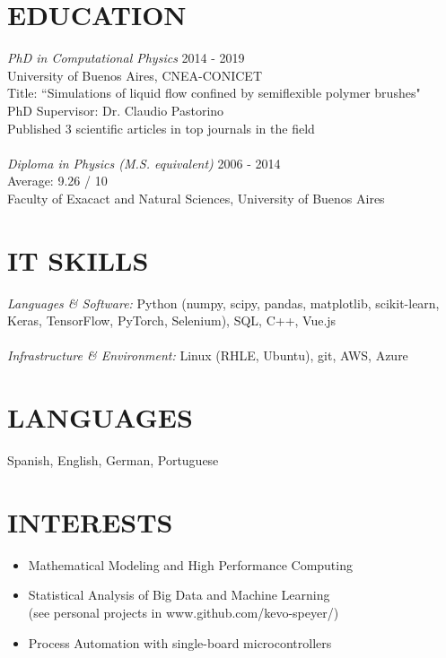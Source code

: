 \documentclass[margin]{res}
\begin{document}
\begin{resume}
\section{EDUCATION} {\sl PhD in Computational Physics}  \hfill 2014 - 2019 \\
                University of Buenos Aires, CNEA-CONICET \\ 
                Title: ``Simulations of liquid flow confined by semiflexible 
		polymer brushes"  \\
                PhD Supervisor: Dr. Claudio Pastorino \\ 
                Published 3 scientific articles in top journals in the field \\ 
		\\
 		{\sl Diploma in Physics (M.S. equivalent) }  \hfill 2006 - 2014 \\ 
		Average: 9.26 / 10 \\
		Faculty of Exacact and Natural Sciences, University of Buenos Aires

 
    \section{IT SKILLS} {\sl Languages \& Software:} Python (numpy, scipy, pandas, matplotlib, scikit-learn, Keras, TensorFlow, PyTorch, Selenium), SQL, C++, Vue.js \\ \\ 
    {\sl Infrastructure \& Environment:} Linux (RHLE, Ubuntu), git, AWS, Azure \\
               
 
\section{LANGUAGES}  Spanish, English, German, Portuguese 

\section{INTERESTS}        
       \begin{itemize}  \itemsep -2pt %
        \item	Mathematical Modeling and High Performance Computing 
	\item   Statistical Analysis of Big Data and Machine Learning \\ 
	    	(see personal projects in www.github.com/kevo-speyer/) 
    	\item	Process Automation with single-board microcontrollers 
       \end{itemize}
 

\end{resume}
\end{document}
